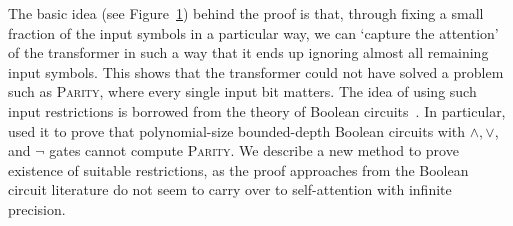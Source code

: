 \documentclass[11pt,a4paper]{article}
\begin{document}
\begin{figure}[ht]
	\label{fig:depth-reduction}
\end{figure}


The basic idea (see Figure~\ref{fig:depth-reduction}) behind the proof is that, through fixing a small fraction of the input symbols in a particular way, we can `capture the attention' of the transformer in such a way that it ends up ignoring almost all remaining input symbols.
This shows that the transformer could not have solved a problem such as \textsc{Parity}, where every single input bit matters.
The idea of using such input restrictions is borrowed from the theory of Boolean circuits~\cite{furst1984parity,yao1986separating,hastad1994optimal}.
In particular, \cite{furst1984parity} used it to prove that polynomial-size bounded-depth Boolean circuits with $\wedge, \vee$, and $\neg$ gates cannot compute \textsc{Parity}.
We describe a new method to prove existence of suitable restrictions, as the proof approaches from the Boolean circuit literature do not seem to carry over to self-attention with infinite precision. %




\end{document}
